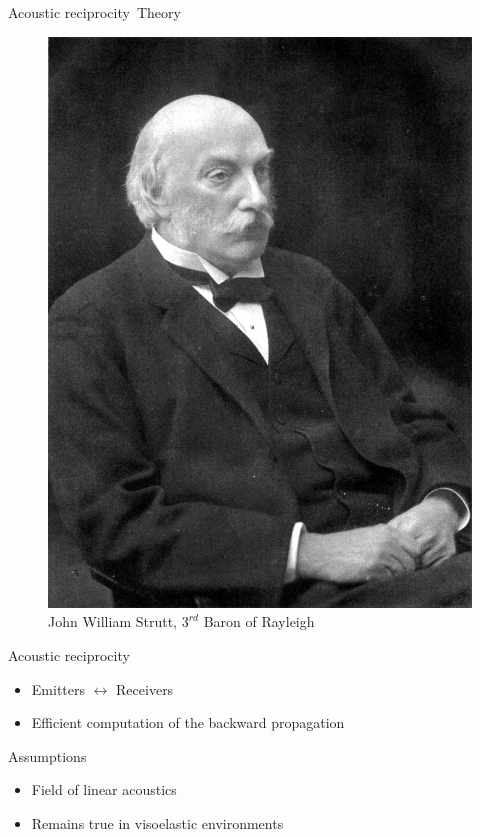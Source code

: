 \documentclass[9pt, xcolor={usenames, dvipsnames}]{beamer}
\begin{document}
				\begin{frame}{Acoustic reciprocity~}{Theory}
					\centering
					\begin{minipage}[c]{0.3\textwidth}
						\begin{figure}
							\includegraphics[width=\textwidth]{images/profile/John_William_Strutt.jpg}
							\caption{John William Strutt, $3^{rd}$ Baron of Rayleigh}
						\end{figure}
					\end{minipage}
					\hfill
					\begin{minipage}[c]{0.6\textwidth}
						\begin{block}{Acoustic reciprocity}
							\begin{itemize}
								\item Emitters $\leftrightarrow$ Receivers
								\item Efficient computation of the backward propagation
							\end{itemize}
						\end{block}
						\begin{block}{Assumptions}
							\begin{itemize}
								\item Field of linear acoustics
								\item Remains true in visoelastic environments
							\end{itemize}
						\end{block}
					\end{minipage}
				\end{frame}
\end{document}
